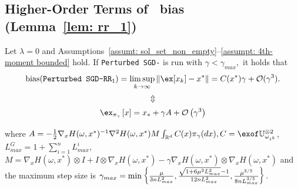 \subsection{Higher-Order Terms of \RRresh\ bias\\(Lemma~\ref{lem: rr_1})}
\begin{lemma}\label{lemma: convergence_of_x}
Let $\lambda=0$ and Assumptions~\ref{assumt: sol_set_non_empty}--\ref{assumpt: 4th-moment bounded} hold.  
If \texttt{Perturbed SGD-\RRresh} is run with $\gamma < \gamma_{max},$ it holds that
\[       \mathrm{bias}(\texttt{Perturbed SGD-\RRresh})
=\limsup_{k\to\infty}\|\ex[x_k]-x^*\|
= C(x^*)\gamma+\mathcal{O}(\gamma^3).\]\[\Updownarrow\] \[\Expepgamma{x} = x_* + \gamma A + \mathcal{O}\left(\gamma^3\right)\]
  
    where $A = - \frac{1}{2} \nabla_{x} H(\omega,x^*)^{-1}\nabla^2 H(\omega,x^*)M \int_{\mathbb{R}^d} C(x) \pi_\gamma(dx), C = \Expe{\mathbb{U}_{\omega_{1^k}}^{\otimes 2}}$, $L_{max}^G = 1 + \sum\limits_{i=1}^{n} L_{max}^i$, $M = \nabla_{x} H(\omega,x^*)\otimes I + I \otimes \nabla_{x} H(\omega,x^*)-\gamma \nabla_{x} H(\omega,x^*)\otimes \nabla_{x} H(\omega,x^*)$ and the maximum step size is $\gamma_{max} = \min\left\{\frac{\mu}{3nL_{max}^2}, \frac{\sqrt{1+6 \mu^2 L_{max}^2} -1}{12nL_{max}^2}, \frac{\mu^{3/5}}{8nL_{max}^{3/5}}\right\}$.
\end{lemma}
